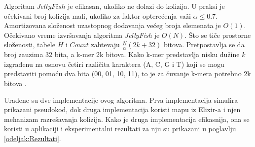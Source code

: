 \documentclass[12pt,oneside]{memoir}
\begin{document}
\begin{comment}

\begin{figure}[!ht]
  \centering
  \texttt{[image: 58\_3algoritma.PNG]}
  \caption{Razmatra se skup 4-mera $Z = \{AC; CG; AC; GT; CA; GG; AC; GT\}$: (a) Ilustruje jednostavan metod za brojanje k-mera koji koristi tabelu \textit{Count} veličine 4k. (b) Ilustruje \textit{JellyFish} metod brojanja k-mera koja koristi heš tabelu veličine 7. Heš funkcija je $h(z) = b(z)$ \textit{mod} $7$. Na primer, $GT$ se čuva u tabeli $Count$ sa indeksom 4, jer je $h(GT) = 4$. U ovom primeru se javlja jedna kolizija. Pošto je i $h(CA) = 4$, $CA$ je u koliziji sa $GT$. Linearnim isprobavanjem $CA$ se ipak čuva u tabeli $Count$ sa indeksom 5. (c) Ilustruje DSK metod brojanja k-mera.
Pretpostavka je da je $h(z) = b(z)$, $n_{list} = 2$ i $n_{sublist} = 2$. DSK deli Z u
4 ($= n_{list} * n_{sublist}$) podliste, a zatim pokreće \textit{JellyFish} algoritam za brojanje k-mera u svakoj podlisti.}
  \label{fig:5}
  \source{\cite{WingKinSung}}
\end{figure}

Slika \ref{fig:5}(b) daje primer koji ilustruje algoritam $JellyFish$. 
\end{comment}

Algoritam $JellyFish$ je efikasan, ukoliko ne dolazi do kolizija. U praksi je očekivani broj kolizija mali, ukoliko za faktor opterećenja važi $\alpha \leq 0.7$. Amortizovana složenost uzastopnog dodavanja većeg broja elemenata je $O(1)$. Očekivano vreme izvršavanja algoritma \textit{JellyFish} je $O(N)$. Što se tiče prostorne složenosti, tabele $H$ i $Count$ zahtevaju $\frac{N}{\alpha}(2k + 32)$ bitova. Pretpostavlja se da broj zauzima 32 bita, a k-mer 2k bitova. Kako k-mer predstavlja nisku dužine $k$ izgrađenu na osnovu četiri različita karaktera (A, C, G i T) koji se mogu predstaviti pomoću dva bita (00, 01, 10, 11), to je za čuvanje k-mera potrebno 2k bitova \cite{WingKinSung}.

Urađene su  dve implementacije ovog algoritma. Prva implementacija simulira prikazani pseudokod, dok druga implementacija koristi mapu iz Elixir-a i njen mehanizam razrešavanja kolizija. Kako je druga implementacija efikasnija, ona se koristi u aplikaciji i eksperimentalni rezultati za nju su prikazani u poglavlju \ref{odeljak:Rezultati}. 
\end{document}
